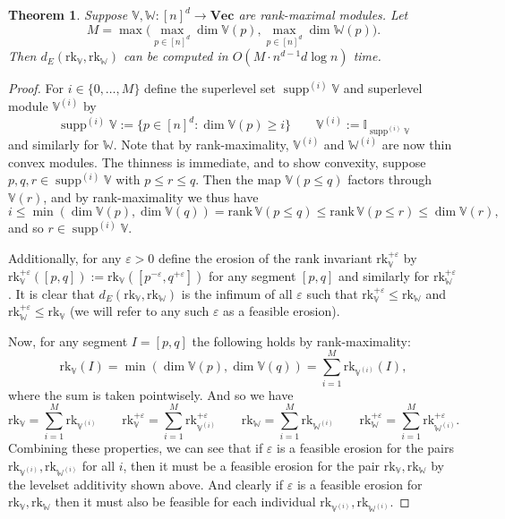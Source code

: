 \documentclass[a4paper,UKenglish,thm-restate]{article}
\newtheorem{theorem}{Theorem}[section]
\theoremstyle{definition}
\def\bbv{\mathbb{V}}
\def\bbw{\mathbb{W}}
\def\bvec{\mathbf{Vec}}
\DeclareMathOperator{\supp}{supp}
\begin{document}
            \begin{theorem}
                Suppose $\bbv, \bbw: [n]^d \rightarrow \bvec$ are rank-maximal modules. Let \[M = \max{\Big(\max_{p \in [n]^d} \dim \bbv(p), \max_{p \in [n]^d} \dim \bbw(p)\Big)}.\]
                Then $d_E(\mathrm{rk}_\bbv, \mathrm{rk}_\bbw)$ can be computed in $O(M \cdot n^{d-1} d \log{n})$ time.
            \end{theorem}
            \begin{proof}
                For $i \in \{0, \ldots, M\}$ define the superlevel set $\supp^{(i)} \bbv$ and superlevel module $\bbv^{(i)}$ by \[\supp^{(i)} \bbv := \{p \in [n]^d : \dim \bbv(p) \geq i \} \qquad \bbv^{(i)} := \mathbb{I}_{\supp^{(i)} \bbv} \] and similarly for $\bbw$. Note that by rank-maximality, $\bbv^{(i)}$ and $\bbw^{(i)}$ are now thin convex modules. The thinness is immediate, and to show convexity, suppose $p, q, r \in \supp^{(i)} \bbv$ with $p \leq r \leq q$. Then the map $\bbv(p \leq q)$ factors through $\bbv(r)$, and by rank-maximality we thus have \[i \leq \min{(\dim \bbv(p), \dim \bbv(q))} = \mathrm{rank}\, \bbv(p \leq q) \leq \mathrm{rank}\, \bbv(p \leq r) \leq \dim \bbv(r),\]
                and so $r \in \supp^{(i)} \bbv$.
                
                Additionally, for any $\varepsilon > 0$ define the erosion of the rank invariant $\mathrm{rk}_{\bbv}^{+\varepsilon}$ by $\mathrm{rk}_{\bbv}^{+\varepsilon}([p, q]) := \mathrm{rk}_\bbv([p^{-\varepsilon}, q^{+\varepsilon}])$ for any segment $[p, q]$ and similarly for $\mathrm{rk}_{\bbw}^{+\varepsilon}$. It is clear that $d_E(\mathrm{rk}_\bbv, \mathrm{rk}_\bbw)$ is the infimum of all $\varepsilon$ such that $\mathrm{rk}_{\bbv}^{+\varepsilon} \leq \mathrm{rk}_{\bbw}$ and $\mathrm{rk}_{\bbw}^{+\varepsilon} \leq \mathrm{rk}_{\bbv}$ (we will refer to any such $\varepsilon$ as a feasible erosion).

                Now, for any segment $I = [p, q]$ the following holds by rank-maximality: \[\mathrm{rk}_{\bbv}(I) = \min{(\dim \bbv(p), \dim \bbv(q))} = \sum_{i=1}^M \mathrm{rk}_{\bbv^{(i)}}(I),\]
                where the sum is taken pointwisely. And so we have \[\mathrm{rk}_{\bbv} = \sum_{i=1}^M \mathrm{rk}_{\bbv^{(i)}} \qquad \mathrm{rk}_{\bbv}^{+\varepsilon} = \sum_{i=1}^M \mathrm{rk}^{+\varepsilon}_{\bbv^{(i)}} \qquad \mathrm{rk}_{\bbw} = \sum_{i=1}^M \mathrm{rk}_{\bbw^{(i)}} \qquad \mathrm{rk}^{+\varepsilon}_{\bbw} = \sum_{i=1}^M \mathrm{rk}^{+\varepsilon}_{\bbw^{(i)}}.\]                
                Combining these properties, we can see that if $\varepsilon$ is a feasible erosion for the pairs $\mathrm{rk}_{\bbv^{(i)}}, \mathrm{rk}_{\bbw^{(i)}}$ for all $i$, then it must be a feasible erosion for the pair $\mathrm{rk}_\bbv, \mathrm{rk}_\bbw$ by the levelset additivity shown above. And clearly if $\varepsilon$ is a feasible erosion for $\mathrm{rk}_\bbv, \mathrm{rk}_\bbw$ then it must also be feasible for each individual $\mathrm{rk}_{\bbv^{(i)}}, \mathrm{rk}_{\bbw^{(i)}}$.


\end{proof}
\end{document}
